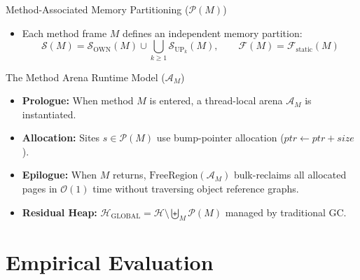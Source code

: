 \documentclass[11pt]{beamer}
\begin{document}
\begin{frame}{Method-Associated Memory Partitioning ($\mathcal{P}(M)$)}
  \vspace{-0.3em}
  \begin{itemize}
    \item Each method frame $M$ defines an independent memory partition:
      $$\mathcal{S}(M) = \mathcal{S}_{\text{OWN}}(M) \cup \bigcup_{k \ge 1} \mathcal{S}_{\text{UP}_k}(M), \qquad \mathcal{F}(M) = \mathcal{F}_{\text{static}}(M)$$
  \end{itemize}
  \vspace{-0.4em}
  \begin{block}{The Method Arena Runtime Model ($\mathcal{A}_M$)}
    \small
    \begin{itemize}\setlength{\itemsep}{1.5pt}
      \item \textbf{Prologue:} When method $M$ is entered, a thread-local arena $\mathcal{A}_M$ is instantiated.
      \item \textbf{Allocation:} Sites $s \in \mathcal{P}(M)$ use bump-pointer allocation ($ptr \gets ptr + size$).
      \item \textbf{Epilogue:} When $M$ returns, $\text{FreeRegion}(\mathcal{A}_M)$ bulk-reclaims all allocated pages in $\mathcal{O}(1)$ time without traversing object reference graphs.
      \item \textbf{Residual Heap:} $\mathcal{H}_{\text{GLOBAL}} = \mathcal{H} \setminus \biguplus_{M} \mathcal{P}(M)$ managed by traditional GC.
    \end{itemize}
  \end{block}
\end{frame}

\section[Empirical Evaluation]{Empirical Evaluation}
\end{document}
